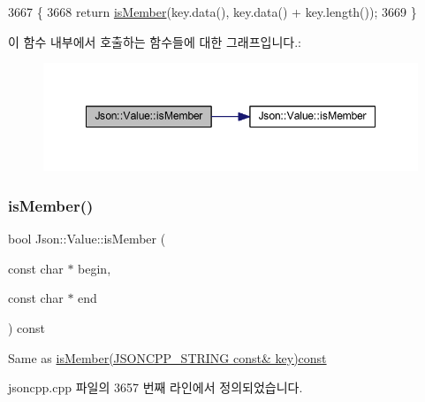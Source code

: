 \begin{DoxyCode}
3667 \{
3668   \textcolor{keywordflow}{return} \hyperlink{class_json_1_1_value_ad6d4df2227321bab05e86667609a7fad}{isMember}(key.data(), key.data() + key.length());
3669 \}
\end{DoxyCode}
이 함수 내부에서 호출하는 함수들에 대한 그래프입니다.\+:\nopagebreak
\begin{figure}[H]
\begin{center}
\leavevmode
\includegraphics[width=348pt]{class_json_1_1_value_a0c2cd838217b23ee6bde8135de1b30d9_cgraph}
\end{center}
\end{figure}
\mbox{\label{class_json_1_1_value_a2007e1e51f21f44ecf1f13e4a1c567b9}} 
\subsubsection{\texorpdfstring{is\+Member()}{isMember()}\hspace{0.1cm}{\footnotesize\ttfamily [3/3]}}
{\footnotesize\ttfamily bool Json\+::\+Value\+::is\+Member (\begin{DoxyParamCaption}\item[{const char $\ast$}]{begin,  }\item[{const char $\ast$}]{end }\end{DoxyParamCaption}) const}



Same as \hyperlink{class_json_1_1_value_a0c2cd838217b23ee6bde8135de1b30d9}{is\+Member(\+J\+S\+O\+N\+C\+P\+P\+\_\+\+S\+T\+R\+I\+N\+G const\& key)const} 



jsoncpp.\+cpp 파일의 3657 번째 라인에서 정의되었습니다.


